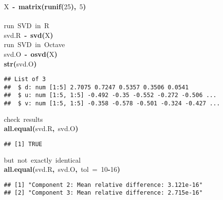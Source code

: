 \documentclass[english,10pt,a4paper]{article}\usepackage{graphicx, color}
\makeatletter
\newcommand{\hlnumber}[1]{\textcolor[rgb]{0,0,0}{#1}}%
\newcommand{\hlfunctioncall}[1]{\textcolor[rgb]{0.501960784313725,0,0.329411764705882}{\textbf{#1}}}%
\newcommand{\hlkeyword}[1]{\textcolor[rgb]{0,0,0}{\textbf{#1}}}%
\newcommand{\hlargument}[1]{\textcolor[rgb]{0.690196078431373,0.250980392156863,0.0196078431372549}{#1}}%
\newcommand{\hlcomment}[1]{\textcolor[rgb]{0.180392156862745,0.6,0.341176470588235}{#1}}%
\newcommand{\hlassignement}[1]{\textcolor[rgb]{0,0,0}{\textbf{#1}}}%
\newcommand{\hlsymbol}[1]{\textcolor[rgb]{0,0,0}{#1}}%
\newcommand{\hlstd}[1]{\textcolor[rgb]{0,0,0}{#1}}%
\newenvironment{kframe}{%
 \def\FrameCommand##1{\hskip\@totalleftmargin \hskip-\fboxsep
 \colorbox{shadecolor}{##1}\hskip-\fboxsep
     \hskip-\linewidth \hskip-\@totalleftmargin \hskip\columnwidth}%
 \MakeFramed {\advance\hsize-\width
   \@totalleftmargin\z@ \linewidth\hsize
   \@setminipage}}%
 {\par\unskip\endMakeFramed}
\newenvironment{knitrout}{}{} %
\makeatother
\begin{document}
\begin{knitrout}
\begin{kframe}
\begin{flushleft}
\hlstd{}\hlsymbol{X}{\ }\hlassignement{\usebox{\hlnormalsizeboxlessthan}-}{\ }\hlfunctioncall{matrix}\hlkeyword{(}\hlfunctioncall{runif}\hlkeyword{(}\hlnumber{25}\hlkeyword{)}\hlkeyword{,}{\ }\hlnumber{5}\hlkeyword{)}\hspace*{\fill}\\
\hlstd{}\hspace*{\fill}\\
\hlstd{}\hlcomment{\usebox{\hlnormalsizeboxhash}{\ }run{\ }SVD{\ }in{\ }R}\hspace*{\fill}\\
\hlstd{}\hlsymbol{svd.R}{\ }\hlassignement{\usebox{\hlnormalsizeboxlessthan}-}{\ }\hlfunctioncall{svd}\hlkeyword{(}\hlsymbol{X}\hlkeyword{)}\hspace*{\fill}\\
\hlstd{}\hlcomment{\usebox{\hlnormalsizeboxhash}{\ }run{\ }SVD{\ }in{\ }Octave}\hspace*{\fill}\\
\hlstd{}\hlsymbol{svd.O}{\ }\hlassignement{\usebox{\hlnormalsizeboxlessthan}-}{\ }\hlfunctioncall{o\usebox{\hlnormalsizeboxunderscore}svd}\hlkeyword{(}\hlsymbol{X}\hlkeyword{)}\hspace*{\fill}\\
\hlstd{}\hlfunctioncall{str}\hlkeyword{(}\hlsymbol{svd.O}\hlkeyword{)}\mbox{}
\normalfont
\end{flushleft}
\begin{verbatim}
## List of 3
##  $ d: num [1:5] 2.7075 0.7247 0.5357 0.3506 0.0541
##  $ u: num [1:5, 1:5] -0.492 -0.35 -0.552 -0.272 -0.506 ...
##  $ v: num [1:5, 1:5] -0.358 -0.578 -0.501 -0.324 -0.427 ...
\end{verbatim}
\begin{flushleft}
\ttfamily\noindent
\hlcomment{\usebox{\hlnormalsizeboxhash}{\ }check{\ }results}\hspace*{\fill}\\
\hlstd{}\hlfunctioncall{all.equal}\hlkeyword{(}\hlsymbol{svd.R}\hlkeyword{,}{\ }\hlsymbol{svd.O}\hlkeyword{)}\mbox{}
\normalfont
\end{flushleft}
\begin{verbatim}
## [1] TRUE
\end{verbatim}
\begin{flushleft}
\ttfamily\noindent
\hlcomment{\usebox{\hlnormalsizeboxhash}{\ }but{\ }not{\ }exactly{\ }identical}\hspace*{\fill}\\
\hlstd{}\hlfunctioncall{all.equal}\hlkeyword{(}\hlsymbol{svd.R}\hlkeyword{,}{\ }\hlsymbol{svd.O}\hlkeyword{,}{\ }\hlargument{tol}{\ }\hlargument{=}{\ }\hlnumber{10}\hlkeyword{\usebox{\hlnormalsizeboxhat}}\hlkeyword{-}\hlnumber{16}\hlkeyword{)}\mbox{}
\normalfont
\end{flushleft}
\begin{verbatim}
## [1] "Component 2: Mean relative difference: 3.121e-16"
## [2] "Component 3: Mean relative difference: 2.715e-16"
\end{verbatim}
\end{kframe}
\end{knitrout}
\end{document}
